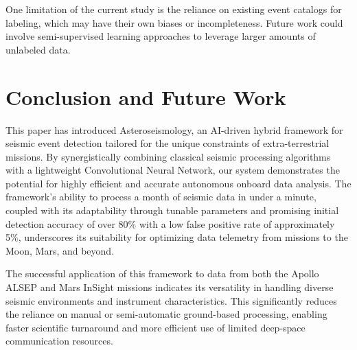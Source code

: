 \documentclass[conference]{IEEEtran}
\begin{document}
One limitation of the current study is the reliance on existing event catalogs for labeling, which may have their own biases or incompleteness. Future work could involve semi-supervised learning approaches to leverage larger amounts of unlabeled data.

\section{Conclusion and Future Work}
\label{sec:conclusion}
This paper has introduced Asteroseismology, an AI-driven hybrid framework for seismic event detection tailored for the unique constraints of extra-terrestrial missions. By synergistically combining classical seismic processing algorithms with a lightweight Convolutional Neural Network, our system demonstrates the potential for highly efficient and accurate autonomous onboard data analysis. The framework's ability to process a month of seismic data in under a minute, coupled with its adaptability through tunable parameters and promising initial detection accuracy of over 80\% with a low false positive rate of approximately 5\%, underscores its suitability for optimizing data telemetry from missions to the Moon, Mars, and beyond.

The successful application of this framework to data from both the Apollo ALSEP and Mars InSight missions indicates its versatility in handling diverse seismic environments and instrument characteristics. This significantly reduces the reliance on manual or semi-automatic ground-based processing, enabling faster scientific turnaround and more efficient use of limited deep-space communication resources.
\end{document}
